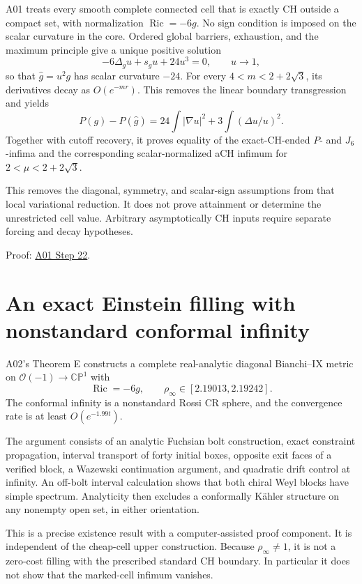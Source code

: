 \documentclass[
]{article}
\begin{document}
A01 treats every smooth complete connected cell that is exactly CH
outside a compact set, with normalization \(\operatorname{Ric}=-6g\). No
sign condition is imposed on the scalar curvature in the core. Ordered
global barriers, exhaustion, and the maximum principle give a unique
positive solution \[
 -6\Delta_gu+s_gu+24u^3=0,\qquad u\to1,
\] so that \(\widehat g=u^2g\) has scalar curvature \(-24\). For every
\(4<m<2+2\sqrt3\), its derivatives decay as \(O(e^{-mr})\). This removes
the linear boundary transgression and yields \[
 P(g)-P(\widehat g)=24\int|\nabla u|^2+3\int(\Delta u/u)^2.
\] Together with cutoff recovery, it proves equality of the
exact-CH-ended \(P\)- and \(J_6\)-infima and the corresponding
scalar-normalized aCH infimum for \(2<\mu<2+2\sqrt3\).

This removes the diagonal, symmetry, and scalar-sign assumptions from
that local variational reduction. It does not prove attainment or
determine the unrestricted cell value. Arbitrary asymptotically CH
inputs require separate forcing and decay hypotheses.

Proof:
\href{sources/Sessions/S1003A01/workspace/notes/step22_exact_CH_conformal_reduction.md}{A01
Step 22}.

\hypertarget{an-exact-einstein-filling-with-nonstandard-conformal-infinity}{%
\section{An exact Einstein filling with nonstandard conformal
infinity}\label{an-exact-einstein-filling-with-nonstandard-conformal-infinity}}

A02's Theorem E constructs a complete real-analytic diagonal Bianchi--IX
metric on \(\mathcal O(-1)\to\mathbb{CP}^1\) with \[
 \operatorname{Ric}=-6g,
 \qquad \rho_\infty\in[2.19013,2.19242].
\] The conformal infinity is a nonstandard Rossi CR sphere, and the
convergence rate is at least \(O(e^{-1.99t})\).

The argument consists of an analytic Fuchsian bolt construction, exact
constraint propagation, interval transport of forty initial boxes,
opposite exit faces of a verified block, a Wazewski continuation
argument, and quadratic drift control at infinity. An off-bolt interval
calculation shows that both chiral Weyl blocks have simple spectrum.
Analyticity then excludes a conformally Kähler structure on any nonempty
open set, in either orientation.

This is a precise existence result with a computer-assisted proof
component. It is independent of the cheap-cell upper construction.
Because \(\rho_\infty\ne1\), it is not a zero-cost filling with the
prescribed standard CH boundary. In particular it does not show that the
marked-cell infimum vanishes.
\end{document}
